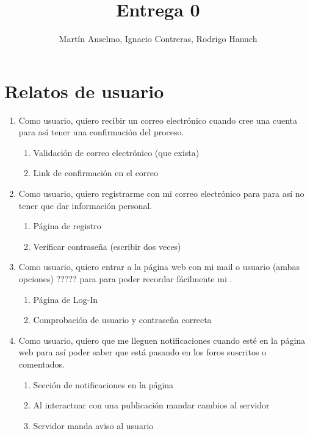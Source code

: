 \documentclass[12pt, letterpaper, notitlepage]{article}
\title{\textbf{Entrega 0}}
\author{Martín Anselmo, Ignacio Contreras, Rodrigo Hanuch}
\begin{document}
\clearpage\maketitle
\thispagestyle{empty}

\newpage

\section*{Relatos de usuario}
\newcommand{\story}[3]{Como {#1}, quiero {#2} para {#3}.}

\begin{enumerate}

	\item \story{usuario}{recibir un correo electrónico cuando cree una cuenta}	
		{así tener una confirmación del proceso}
		\begin{enumerate}
			\item Validación de correo electrónico (que exista)
			\item Link de confirmación en el correo		
		\end{enumerate}
		
	\item \story{usuario}{registrarme con mi correo electrónico}{para así no tener que 
		dar información personal}
		\begin{enumerate}
			\item Página de registro
			\item Verificar contraseña (escribir dos veces)
		\end{enumerate}
		
	\item \story{usuario}{entrar a la página web con mi mail o usuario (ambas opciones) ?????}{para poder recordar
		fácilmente mi \say{log-in}}
		\begin{enumerate}
			\item Página de Log-In
			\item Comprobación de usuario y contraseña correcta
		\end{enumerate}
		
	\item \story{usuario}{que me lleguen notificaciones cuando esté en la página web}		
		{así poder saber que está pasando en los foros suscritos o comentados}
		\begin{enumerate}
			\item Sección de notificaciones en la página
			\item Al interactuar con una publicación mandar cambios al servidor
			\item Servidor manda aviso al usuario
		\end{enumerate}
		

\end{enumerate}
\end{document}
